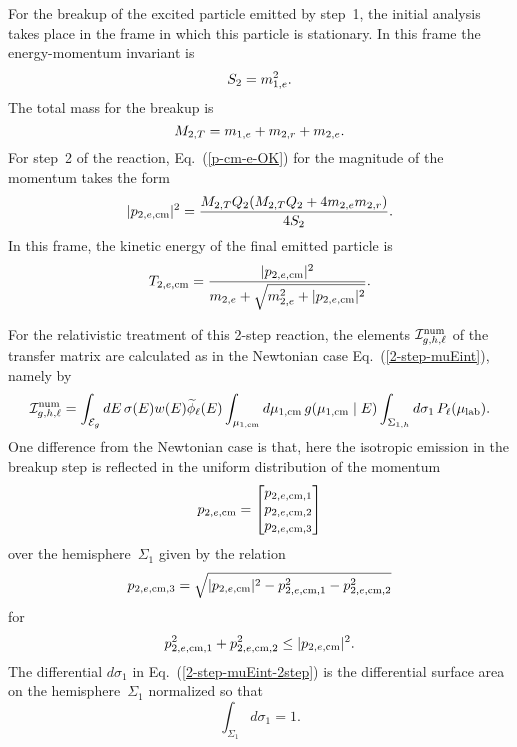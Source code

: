 {For the breakup of the excited particle emitted
by step~1, the initial analysis takes place in the 
frame in which this particle is stationary.  In this frame
the energy-momentum invariant is
$$
  S_2 = m_{1,e}^2.
$$
The total mass for the breakup is
$$
  M_{2,T} = m_{1,e} + m_{2,r} + m_{2,e}.
$$
For step~2 of the reaction, Eq.~(\ref{p-cm-e-OK}) for the
magnitude of the momentum takes the form
\begin{equation}
  |p_{2,e,\textrm{cm}}|^2 = \frac{ M_{2,T} Q_2 
                 ( M_{2,T} Q_2 + 4m_{2,e} m_{2,r})}
                {4 S_2 }.
  \label{p-cm-e-OK-step2}
\end{equation}
In this frame, the
kinetic energy of the final emitted particle is
\begin{equation}
  T_{2,e,\textrm{cm}} = \frac{|p_{2,e,\textrm{cm}}|^2 }
          {m_{2,e} + \sqrt{ m_{2,e}^2 + |p_{2,e,\textrm{cm}}|^2 }}.
  \label{T-cm-e-OK-step2}
\end{equation}

For the relativistic treatment of this 2-step reaction,
the elements ${\cal I}^{\text{num}}_{g,h,\ell}$ of the transfer matrix are calculated
as in the Newtonian case Eq.~(\ref{2-step-muEint}), namely by
\begin{equation}
    {\cal I}^{\text{num}}_{g,h,\ell} =
     \int_{{\cal E}_g} dE \, \sigma ( E ) w(E) \widetilde \phi_\ell(E)
    \int_{\mu_{\text{1,cm}}} d\mu_{\text{1,cm}}  \, g(\mu_{\text{1,cm}} \mid E)
    \int_{\Sigma_{1,h}} d\sigma_1 \, P_\ell( \mu_{\text{lab}} ).
  \label{2-step-muEint-2step}
\end{equation}
One difference from the Newtonian case is that, here
the isotropic emission in the breakup step is reflected
in the uniform distribution of the momentum
$$
   p_{2,e,\textrm{cm}} =
  \begin{bmatrix}
    p_{2,e,\textrm{cm},1} \\
    p_{2,e,\textrm{cm},2} \\
    p_{2,e,\textrm{cm},3}
  \end{bmatrix}
$$
over the hemisphere~$\Sigma_1$ given by the relation
\begin{equation}
  p_{2,e,\textrm{cm},3} =
  \sqrt{ |  p_{2,e,\textrm{cm}} |^2 -  p_{2,e,\textrm{cm},1}^2 -  p_{2,e,\textrm{cm},2}^2 }
  \label{2-step-def-Sigma0}
\end{equation}
for
$$
  p_{2,e,\textrm{cm},1}^2 +  p_{2,e,\textrm{cm},2}^2 \le |  p_{2,e,\textrm{cm}} |^2.
$$
The differential $ d\sigma_1$ in Eq.~(\ref{2-step-muEint-2step})
is the differential surface area
on the hemisphere~$\Sigma_1$ normalized so that
$$
  \int_{\Sigma_1} d\sigma_1 = 1.
$$

}
